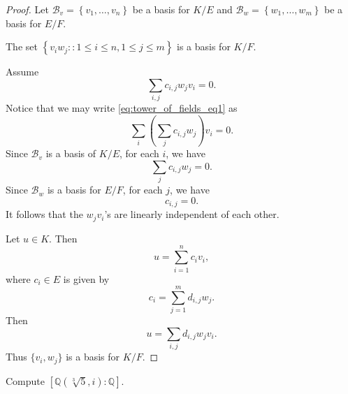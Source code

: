 \documentclass[notoc,notitlepage]{tufte-book}
\begin{document}
\begin{proof}
  Let $\mathcal{B}_v = \left\{ v_1, \ldots, v_n \right\}$ be a basis for $K / E$ and
  $\mathcal{B}_w = \left\{ w_1, \ldots, w_m \right\}$ be a basis for $E / F$.

  \noindent
   The set $\left\{ v_i w_j : :1 \leq i \leq n, 1 \leq j \leq m \right\}$
  is a basis for $K / F$.

  \noindent
   Assume
  \begin{equation}\label{eq:tower_of_fields_eq1}
    \sum_{i, j} c_{i, j} w_j v_i = 0.
  \end{equation}
  Notice that we may write \cref{eq:tower_of_fields_eq1} as
  \begin{equation*}
    \sum_{i} \left( \sum_{j} c_{i, j} w_j \right) v_i = 0.
  \end{equation*}
  Since $\mathcal{B}_v$ is a basis of $K / E$, for each $i$, we have
  \begin{equation*}
    \sum_{j} c_{i, j} w_j = 0.
  \end{equation*}
  Since $\mathcal{B}_w$ is a basis for $E / F$, for each $j$, we have
  \begin{equation*}
    c_{i, j} = 0.
  \end{equation*}
  It follows that the $w_j v_i$'s are linearly independent of each other.

  \noindent
   Let $u \in K$. Then
  \begin{equation*}
    u = \sum_{i=1}^{n} c_i v_i,
  \end{equation*}
  where $c_i \in E$ is given by
  \begin{equation*}
    c_i = \sum_{j=1}^{m} d_{i, j} w_j.
  \end{equation*}
  Then
  \begin{equation*}
    u = \sum_{i, j} d_{i, j} w_j v_i.
  \end{equation*}
  Thus $\{ v_i, w_j \}$ is a basis for $K / F$.
\end{proof}

\begin{eg}
  Compute $[\mathbb{Q}(\sqrt[3]{5}, i) : \mathbb{Q}]$.
\end{eg}
\end{document}
